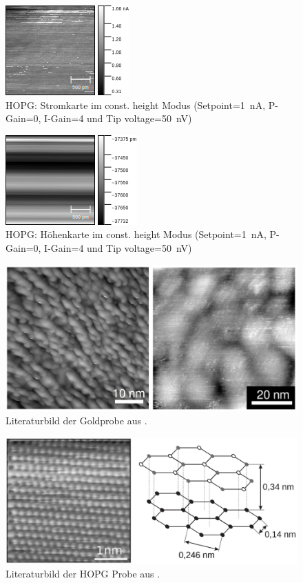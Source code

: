 \documentclass[sn-mathphys-num,iicol]{sn-jnl}
\theoremstyle{thmstyleone}
\theoremstyle{thmstyletwo}
\theoremstyle{thmstylethree}
\begin{document}
\begin{figure}[h]
        \centering
        \includegraphics[width=.5\textwidth]{../data/Graphit7_current.png}
        \caption{HOPG: Stromkarte im const. height Modus (Setpoint=\SI{1}{\nano A}, P-Gain=\SI{0}{}, I-Gain=\SI{4}{} und Tip voltage=\SI{50}{\nano V})} \label{fig:gr2nm50nVc3}
\end{figure}
\begin{figure}[h]
        \centering
        \includegraphics[width=.5\textwidth]{../data/Graphit7_z.png}
        \caption{HOPG: Höhenkarte im const. height Modus (Setpoint=\SI{1}{\nano A}, P-Gain=\SI{0}{}, I-Gain=\SI{4}{} und Tip voltage=\SI{50}{\nano V})} \label{fig:gr2nm50nVz3}
\end{figure}
\begin{figure}[h]
  \centering
  \includegraphics[width=.5\textwidth]{422_gold_lit.png}
  \caption{Literaturbild der Goldprobe aus \cite{anleitung422}.} \label{fig:gold_lit}
\end{figure}
\begin{figure}[h]
  \centering
  \includegraphics[width=.5\textwidth]{422_HOPG_lit.png}
  \caption{Literaturbild der HOPG Probe aus \cite{anleitung422}.} \label{fig:hopg_lit}
\end{figure}
\end{document}
